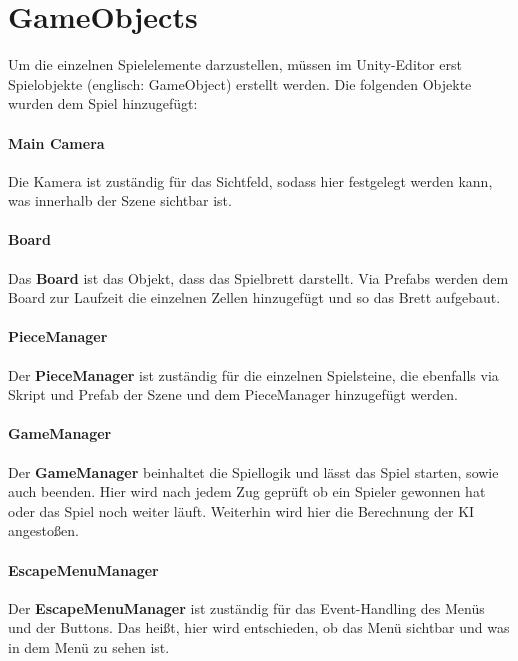 \section{GameObjects}
\label{ch:Implementierung:sec:GameObjects}
Um die einzelnen Spielelemente darzustellen, müssen im Unity-Editor erst Spielobjekte (englisch: GameObject) erstellt werden. Die folgenden Objekte wurden dem Spiel hinzugefügt:
\paragraph{Main Camera}
Die Kamera ist zuständig für das Sichtfeld, sodass hier festgelegt werden kann, was innerhalb der Szene sichtbar ist.
\paragraph{Board}
Das \textbf{Board} ist das Objekt, dass das Spielbrett darstellt. Via Prefabs werden dem Board zur Laufzeit die einzelnen Zellen hinzugefügt und so das Brett aufgebaut.
\paragraph{PieceManager}
Der \textbf{PieceManager} ist zuständig für die einzelnen Spielsteine, die ebenfalls via Skript und Prefab der Szene und dem PieceManager hinzugefügt werden.
\paragraph{GameManager}
Der \textbf{GameManager} beinhaltet die Spiellogik und lässt das Spiel starten, sowie auch beenden. Hier wird nach jedem Zug geprüft ob ein Spieler gewonnen hat oder das Spiel noch weiter läuft. Weiterhin wird hier die Berechnung der KI angestoßen.
\paragraph{EscapeMenuManager}
Der \textbf{EscapeMenuManager} ist zuständig für das Event-Handling des Menüs und der Buttons. Das heißt, hier wird entschieden, ob das Menü sichtbar und was in dem Menü zu sehen ist.

